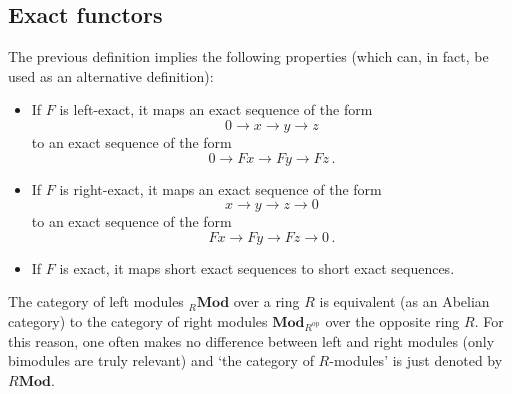 
\subsection{Exact functors}

    \begin{result}
        The previous definition implies the following properties (which can, in fact, be used as an alternative definition):
        \begin{itemize}
            \item If $F$ is left-exact, it maps an exact sequence of the form \[0\longrightarrow x\longrightarrow y\longrightarrow z\]
            to an exact sequence of the form \[0\longrightarrow Fx\longrightarrow Fy\longrightarrow Fz\,.\]
            \item If $F$ is right-exact, it maps an exact sequence of the form \[x\longrightarrow y\longrightarrow z\longrightarrow 0\]
            to an exact sequence of the form \[Fx\longrightarrow Fy\longrightarrow Fz\longrightarrow 0\,.\]
            \item If $F$ is exact, it maps short exact sequences to short exact sequences.
        \end{itemize}
    \end{result}

    \begin{notation}
        The category of left modules ${}_R\mathbf{Mod}$ over a ring $R$ is equivalent (as an Abelian category) to the category of right modules $\mathbf{Mod}_{R^{\text{op}}}$ over the opposite ring $R$. For this reason, one often makes no difference between left and right modules (only bimodules are truly relevant) and `the category of $R$-modules' is just denoted by $R\mathbf{Mod}$.
    \end{notation}

